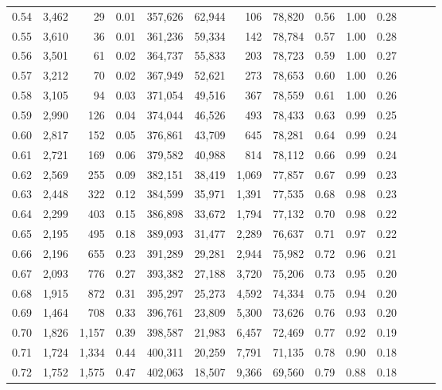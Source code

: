 \begin{tabular}{rrrrrrrrrrrrrr}
0.54 &  3,462 &     29 &  0.01 &  357,626 &   62,944 &     106 &  78,820 &  0.56 &  1.00 &      0.28 \\
0.55 &  3,610 &     36 &  0.01 &  361,236 &   59,334 &     142 &  78,784 &  0.57 &  1.00 &      0.28 \\
0.56 &  3,501 &     61 &  0.02 &  364,737 &   55,833 &     203 &  78,723 &  0.59 &  1.00 &      0.27 \\
0.57 &  3,212 &     70 &  0.02 &  367,949 &   52,621 &     273 &  78,653 &  0.60 &  1.00 &      0.26 \\
0.58 &  3,105 &     94 &  0.03 &  371,054 &   49,516 &     367 &  78,559 &  0.61 &  1.00 &      0.26 \\
0.59 &  2,990 &    126 &  0.04 &  374,044 &   46,526 &     493 &  78,433 &  0.63 &  0.99 &      0.25 \\
0.60 &  2,817 &    152 &  0.05 &  376,861 &   43,709 &     645 &  78,281 &  0.64 &  0.99 &      0.24 \\
0.61 &  2,721 &    169 &  0.06 &  379,582 &   40,988 &     814 &  78,112 &  0.66 &  0.99 &      0.24 \\
0.62 &  2,569 &    255 &  0.09 &  382,151 &   38,419 &   1,069 &  77,857 &  0.67 &  0.99 &      0.23 \\
0.63 &  2,448 &    322 &  0.12 &  384,599 &   35,971 &   1,391 &  77,535 &  0.68 &  0.98 &      0.23 \\
0.64 &  2,299 &    403 &  0.15 &  386,898 &   33,672 &   1,794 &  77,132 &  0.70 &  0.98 &      0.22 \\
0.65 &  2,195 &    495 &  0.18 &  389,093 &   31,477 &   2,289 &  76,637 &  0.71 &  0.97 &      0.22 \\
0.66 &  2,196 &    655 &  0.23 &  391,289 &   29,281 &   2,944 &  75,982 &  0.72 &  0.96 &      0.21 \\
0.67 &  2,093 &    776 &  0.27 &  393,382 &   27,188 &   3,720 &  75,206 &  0.73 &  0.95 &      0.20 \\
0.68 &  1,915 &    872 &  0.31 &  395,297 &   25,273 &   4,592 &  74,334 &  0.75 &  0.94 &      0.20 \\
0.69 &  1,464 &    708 &  0.33 &  396,761 &   23,809 &   5,300 &  73,626 &  0.76 &  0.93 &      0.20 \\
0.70 &  1,826 &  1,157 &  0.39 &  398,587 &   21,983 &   6,457 &  72,469 &  0.77 &  0.92 &      0.19 \\
0.71 &  1,724 &  1,334 &  0.44 &  400,311 &   20,259 &   7,791 &  71,135 &  0.78 &  0.90 &      0.18 \\
0.72 &  1,752 &  1,575 &  0.47 &  402,063 &   18,507 &   9,366 &  69,560 &  0.79 &  0.88 &      0.18 \\

\end{tabular}
